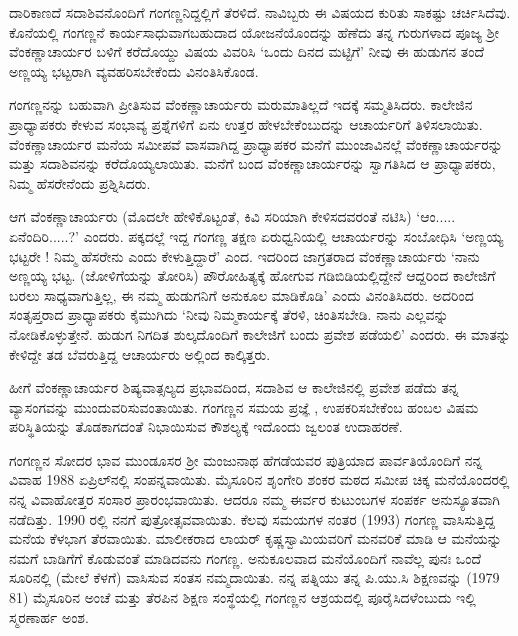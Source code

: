 {ದಾರಿಕಾಣದೆ ಸದಾಶಿವನೊಂದಿಗೆ ಗಂಗಣ್ಣನಿದ್ದಲ್ಲಿಗೆ ತೆರಳಿದೆ. ನಾವಿಬ್ಬರು ಈ ವಿಷಯದ ಕುರಿತು ಸಾಕಷ್ಟು ಚರ್ಚಿಸಿದೆವು. ಕೊನೆಯಲ್ಲಿ ಗಂಗಣ್ಣನೆ ಕಾರ್ಯಸಾಧುವಾಗಬಹುದಾದ ಯೋಜನೆಯೊಂದನ್ನು ಹೆಣೆದು ತನ್ನ ಗುರುಗಳಾದ ಪೂಜ್ಯ ಶ್ರೀ ವೆಂಕಣ್ಣಾಚಾರ್ಯರ ಬಳಿಗೆ ಕರೆದೊಯ್ದು ವಿಷಯ ವಿವರಿಸಿ ‘ಒಂದು ದಿನದ ಮಟ್ಟಿಗೆ’ ನೀವು ಈ ಹುಡುಗನ ತಂದೆ ಅಣ್ಣಯ್ಯ ಭಟ್ಟರಾಗಿ ವ್ಯವಹರಿಸಬೇಕೆಂದು ವಿನಂತಿಸಿಕೊಂಡ.

ಗಂಗಣ್ಣನನ್ನು ಬಹುವಾಗಿ ಪ್ರೀತಿಸುವ ವೆಂಕಣ್ಣಾಚಾರ್ಯರು ಮರುಮಾತಿಲ್ಲದೆ ಇದಕ್ಕೆ ಸಮ್ಮತಿಸಿದರು. ಕಾಲೇಜಿನ ಪ್ರಾಧ್ಯಾಪಕರು ಕೇಳುವ ಸಂಭಾವ್ಯ ಪ್ರಶ್ನೆಗಳಿಗೆ ಏನು ಉತ್ತರ ಹೇಳಬೇಕೆಂಬುದನ್ನು ಆಚಾರ್ಯರಿಗೆ ತಿಳಿಸಲಾಯಿತು. ವೆಂಕಣ್ಣಾಚಾರ್ಯರ ಮನೆಯ ಸಮೀಪವೆ ವಾಸವಾಗಿದ್ದ ಪ್ರಾಧ್ಯಾಪಕರ ಮನೆಗೆ ಮುಂಜಾವಿನಲ್ಲೆ ವೆಂಕಣ್ಣಾಚಾರ್ಯರನ್ನು ಮತ್ತು ಸದಾಶಿವನನ್ನು ಕರೆದೊಯ್ಯಲಾಯಿತು. ಮನೆಗೆ ಬಂದ ವೆಂಕಣ್ಣಾಚಾರ್ಯರನ್ನು ಸ್ವಾಗತಿಸಿದ ಆ ಪ್ರಾಧ್ಯಾಪಕರು, ನಿಮ್ಮ ಹೆಸರೇನೆಂದು ಪ್ರಶ್ನಿಸಿದರು. 

ಆಗ ವೆಂಕಣ್ಣಾಚಾರ್ಯರು (ಮೊದಲೇ ಹೇಳಿಕೊಟ್ಟಂತೆ, ಕಿವಿ ಸರಿಯಾಗಿ ಕೇಳಿಸದವರಂತೆ ನಟಿಸಿ) ‘ಆಂ..... ಏನೆಂದಿರಿ.....?’   \enginline{-}   ಎಂದರು. ಪಕ್ಕದಲ್ಲೆ ಇದ್ದ ಗಂಗಣ್ಣ ತಕ್ಷಣ ಏರುಧ್ವನಿಯಲ್ಲಿ ಆಚಾರ್ಯರನ್ನು ಸಂಬೋಧಿಸಿ ‘ಅಣ್ಣಯ್ಯ ಭಟ್ಟರೇ ! ನಿಮ್ಮ ಹೆಸರೇನು ಎಂದು ಕೇಳುತ್ತಿದ್ದಾರೆ’   \enginline{-}   ಎಂದ. ಇದರಿಂದ ಜಾಗ್ರತರಾದ ವೆಂಕಣ್ಣಾಚಾರ್ಯರು ‘ನಾನು ಅಣ್ಣಯ್ಯ ಭಟ್ಟ. (ಜೋಳಿಗೆಯನ್ನು ತೋರಿಸಿ) ಪೌರೋಹಿತ್ಯಕ್ಕೆ ಹೋಗುವ ಗಡಿಬಿಡಿಯಲ್ಲಿದ್ದೇನೆ ಆದ್ದರಿಂದ ಕಾಲೇಜಿಗೆ ಬರಲು ಸಾಧ್ಯವಾಗುತ್ತಿಲ್ಲ, ಈ ನಮ್ಮ ಹುಡುಗನಿಗೆ ಅನುಕೂಲ ಮಾಡಿಕೊಡಿ’   \enginline{-}   ಎಂದು ವಿನಂತಿಸಿದರು. ಅದರಿಂದ ಸಂತೃಪ್ತರಾದ ಪ್ರಾಧ್ಯಾಪಕರು ಕೈಮುಗಿದು ‘ನೀವು ನಿಮ್ಮಕಾರ್ಯಕ್ಕೆ ತೆರಳಿ, ಚಿಂತಿಸಬೇಡಿ. ನಾನು ಎಲ್ಲವನ್ನು ನೋಡಿಕೊಳ್ಳುತ್ತೇನೆ. ಹುಡುಗ ನಿಗದಿತ ಶುಲ್ಕದೊಂದಿಗೆ ಕಾಲೇಜಿಗೆ ಬಂದು ಪ್ರವೇಶ ಪಡೆಯಲಿ’   \enginline{-}   ಎಂದರು. ಈ ಮಾತನ್ನು ಕೇಳಿದ್ದೇ ತಡ ಬೆವರುತ್ತಿದ್ದ ಆಚಾರ್ಯರು ಅಲ್ಲಿಂದ ಕಾಲ್ಕಿತ್ತರು.

ಹೀಗೆ ವೆಂಕಣ್ಣಾಚಾರ್ಯರ ಶಿಷ್ಯವಾತ್ಸಲ್ಯದ ಪ್ರಭಾವದಿಂದ, ಸದಾಶಿವ ಆ ಕಾಲೇಜಿನಲ್ಲಿ ಪ್ರವೇಶ ಪಡೆದು ತನ್ನ ವ್ಯಾಸಂಗವನ್ನು ಮುಂದುವರಿಸುವಂತಾಯಿತು. ಗಂಗಣ್ಣನ ಸಮಯ ಪ್ರಜ್ಞೆ , ಉಪಕರಿಸಬೇಕೆಂಬ ಹಂಬಲ ವಿಷಮ ಪರಿಸ್ಥಿತಿಯನ್ನು ತೊಡಕಾಗದಂತೆ ನಿಭಾಯಿಸುವ ಕೌಶಲ್ಯಕ್ಕೆ ಇದೊಂದು ಜ್ವಲಂತ ಉದಾಹರಣೆ. 

ಗಂಗಣ್ಣನ ಸೋದರ ಭಾವ ಮುಂಡೂಸರ ಶ್ರೀ ಮಂಜುನಾಥ ಹೆಗಡೆಯವರ ಪುತ್ರಿಯಾದ ಪಾರ್ವತಿಯೊಂದಿಗೆ ನನ್ನ ವಿವಾಹ 1988 ಏಪ್ರಿಲ್‍ನಲ್ಲಿ ಸಂಪನ್ನವಾಯಿತು. ಮೈಸೂರಿನ ಶೃಂಗೇರಿ ಶಂಕರ ಮಠದ ಸಮೀಪ ಚಿಕ್ಕ ಮನೆಯೊಂದರಲ್ಲಿ ನನ್ನ ವಿವಾಹೋತ್ತರ ಸಂಸಾರ ಪ್ರಾರಂಭವಾಯಿತು. ಆದರೂ ನಮ್ಮ ಈರ್ವರ ಕುಟುಂಬಗಳ ಸಂಪರ್ಕ ಅನುಸ್ಯೂತವಾಗಿ ನಡೆದಿತ್ತು. 1990 ರಲ್ಲಿ ನನಗೆ ಪುತ್ರೋತ್ಸವವಾಯಿತು. ಕೆಲವು ಸಮಯಗಳ ನಂತರ (1993) ಗಂಗಣ್ಣ ವಾಸಿಸುತ್ತಿದ್ದ ಮನೆಯ ಕೆಳಭಾಗ ತೆರವಾಯಿತು. ಮಾಲೀಕರಾದ ಲಾಯರ್ ಕೃಷ್ಣಸ್ವಾಮಿಯವರಿಗೆ ಮನವರಿಕೆ ಮಾಡಿ ಆ ಮನೆಯನ್ನು ನಮಗೆ ಬಾಡಿಗೆಗೆ ಕೊಡುವಂತೆ ಮಾಡಿದವನು ಗಂಗಣ್ಣ. ಅನುಕೂಲವಾದ ಮನೆಯೊಂದಿಗೆ ನಾವೆಲ್ಲ ಪುನಃ ಒಂದೆ ಸೂರಿನಲ್ಲಿ (ಮೇಲೆ  \enginline{-}  ಕೆಳಗೆ) ವಾಸಿಸುವ ಸಂತಸ ನಮ್ಮದಾಯಿತು. ನನ್ನ ಪತ್ನಿಯು ತನ್ನ ಪಿ.ಯು.ಸಿ ಶಿಕ್ಷಣವನ್ನು (1979  \enginline{-}  81) ಮೈಸೂರಿನ ಅಂಚೆ ಮತ್ತು ತೆರಪಿನ ಶಿಕ್ಷಣ ಸಂಸ್ಥೆಯಲ್ಲಿ ಗಂಗಣ್ಣನ ಆಶ್ರಯದಲ್ಲಿ ಪೂರೈಸಿದಳೆಂಬುದು ಇಲ್ಲಿ ಸ್ಮರಣಾರ್ಹ ಅಂಶ.

}
